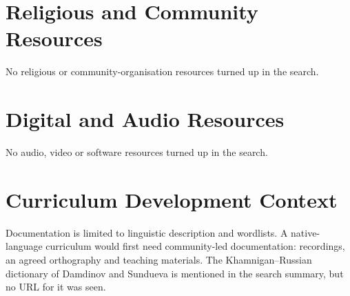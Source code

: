 \documentclass[12pt]{article}
\begin{document}
\section{Religious and Community Resources}
No religious or community-organisation resources turned up in the search.

\section{Digital and Audio Resources}
No audio, video or software resources turned up in the search.

\section{Curriculum Development Context}
Documentation is limited to linguistic description and wordlists. A native-language curriculum would first need community-led documentation: recordings, an agreed orthography and teaching materials. The Khamnigan--Russian dictionary of Damdinov and Sundueva is mentioned in the search summary, but no URL for it was seen.
\end{document}
